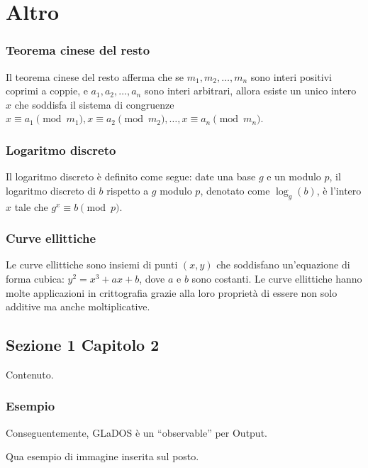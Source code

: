 \documentclass[a4paper,12pt]{report}
\begin{document}
\chapter{Altro}

\subsection*{Teorema cinese del resto}
Il teorema cinese del resto afferma che se \( m_1, m_2, \ldots, m_n \) sono interi positivi coprimi a coppie, e \( a_1, a_2, \ldots, a_n \) sono interi arbitrari, allora esiste un unico intero \( x \) che soddisfa il sistema di congruenze \( x \equiv a_1 \pmod{m_1}, x \equiv a_2 \pmod{m_2}, \ldots, x \equiv a_n \pmod{m_n} \).

\subsection*{Logaritmo discreto}
Il logaritmo discreto è definito come segue: date una base \( g \) e un modulo \( p \), il logaritmo discreto di \( b \) rispetto a \( g \) modulo \( p \), denotato come \( \log_g(b) \), è l'intero \( x \) tale che \( g^x \equiv b \pmod{p} \).

\subsection*{Curve ellittiche}
Le curve ellittiche sono insiemi di punti \( (x, y) \) che soddisfano un'equazione di forma cubica: \( y^2 = x^3 + ax + b \), dove \( a \) e \( b \) sono costanti. Le curve ellittiche hanno molte applicazioni in crittografia grazie alla loro proprietà di essere non solo additive ma anche moltiplicative.

\section{Sezione 1 Capitolo 2}

Contenuto.

\subsection*{Esempio}
Conseguentemente, GLaDOS è un ``observable'' per Output.

Qua esempio di immagine inserita sul posto.
\end{document}
